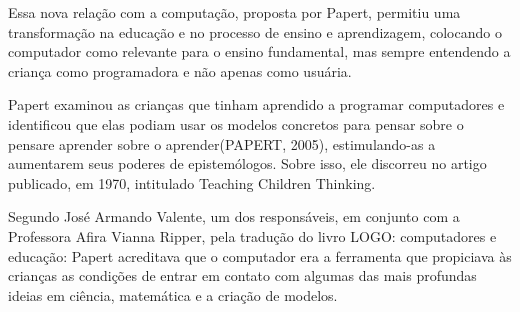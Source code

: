\documentclass[
12pt,		%
openright,	%
twoside,  %
a4paper,			%
chapter=TITLE,		%
english,			%
french,				%
spanish,			%
brazil				%
]{USPSC-classe/USPSC}
\begin{document}
\noindent\begin{center}\mbox{\centering{}}\end{center}


Essa nova rela\c{c}\~ao com a computa\c{c}\~ao, proposta por Papert, permitiu uma transforma\c{c}\~ao na educa\c{c}\~ao e no processo de ensino e aprendizagem, colocando o computador como relevante para o ensino fundamental, mas sempre entendendo a crian\c{c}a como programadora e n\~ao apenas como usu\'aria.

















Papert examinou as crian\c{c}as que tinham aprendido a programar computadores e identificou que elas podiam usar os modelos concretos para \textquotedbl pensar sobre o pensar\textquotedbl  e \textquotedbl aprender sobre o aprender\textquotedbl   (PAPERT, 2005), estimulando-as  a aumentarem seus poderes de epistem\'ologos. Sobre isso, ele discorreu no artigo publicado, em 1970, intitulado Teaching Children Thinking.

















Segundo Jos\'e Armando Valente, um dos respons\'aveis, em conjunto com a Professora Afira Vianna Ripper, pela tradu\c{c}\~ao do livro LOGO: computadores e educa\c{c}\~ao: \textquotedbl Papert acreditava que o computador era a ferramenta que propiciava \`as crian\c{c}as as condi\c{c}\~oes de entrar em contato com algumas das mais profundas ideias em ci\^encia, matem\'atica e a cria\c{c}\~ao de modelos\textquotedbl .
\end{document}

